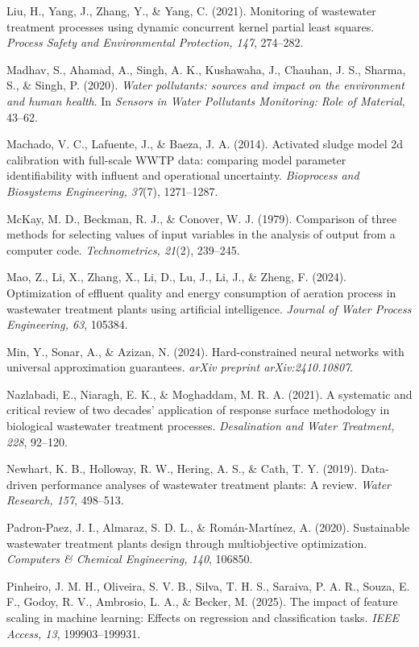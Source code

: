 \documentclass[a4paper,fleqn]{cas-sc}
\begin{document}
\noindent Liu, H., Yang, J., Zhang, Y., \& Yang, C. (2021). Monitoring of wastewater treatment processes using dynamic concurrent kernel partial least squares. \textit{Process Safety and Environmental Protection, 147}, 274--282.

\noindent Madhav, S., Ahamad, A., Singh, A. K., Kushawaha, J., Chauhan, J. S., Sharma, S., \& Singh, P. (2020). \textit{Water pollutants: sources and impact on the environment and human health}. In \textit{Sensors in Water Pollutants Monitoring: Role of Material}, 43--62.

\noindent Machado, V. C., Lafuente, J., \& Baeza, J. A. (2014). Activated sludge model 2d calibration with full-scale WWTP data: comparing model parameter identifiability with influent and operational uncertainty. \textit{Bioprocess and Biosystems Engineering, 37}(7), 1271--1287.

\noindent McKay, M. D., Beckman, R. J., \& Conover, W. J. (1979). Comparison of three methods for selecting values of input variables in the analysis of output from a computer code. \textit{Technometrics, 21}(2), 239--245.

\noindent Mao, Z., Li, X., Zhang, X., Li, D., Lu, J., Li, J., \& Zheng, F. (2024). Optimization of effluent quality and energy consumption of aeration process in wastewater treatment plants using artificial intelligence. \textit{Journal of Water Process Engineering, 63}, 105384.

\noindent Min, Y., Sonar, A., \& Azizan, N. (2024). Hard-constrained neural networks with universal approximation guarantees. \textit{arXiv preprint arXiv:2410.10807}.

\noindent Nazlabadi, E., Niaragh, E. K., \& Moghaddam, M. R. A. (2021). A systematic and critical review of two decades' application of response surface methodology in biological wastewater treatment processes. \textit{Desalination and Water Treatment, 228}, 92--120.

\noindent Newhart, K. B., Holloway, R. W., Hering, A. S., \& Cath, T. Y. (2019). Data-driven performance analyses of wastewater treatment plants: A review. \textit{Water Research, 157}, 498--513.

\noindent Padron-Paez, J. I., Almaraz, S. D. L., \& Rom\'an-Mart\'inez, A. (2020). Sustainable wastewater treatment plants design through multiobjective optimization. \textit{Computers \& Chemical Engineering, 140}, 106850.

\noindent Pinheiro, J. M. H., Oliveira, S. V. B., Silva, T. H. S., Saraiva, P. A. R., Souza, E. F., Godoy, R. V., Ambrosio, L. A., \& Becker, M. (2025). The impact of feature scaling in machine learning: Effects on regression and classification tasks. \textit{IEEE Access, 13}, 199903--199931.
\end{document}
